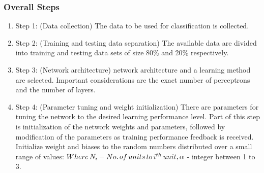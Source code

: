 \documentclass[a4paper,14pt,onecolumn]{article}
\begin{document}
\subsubsection{Overall Steps}
\begin{enumerate}

\item Step 1: (Data collection) The data to be used for classification is collected. 

\item Step 2: (Training and testing data separation) The available data are divided into training and testing data sets of size 80\% and 20\% respectively.

\item Step 3: (Network architecture) network architecture and a learning method are selected. Important considerations are the exact number of perceptrons and the number of layers. 
 
\item Step 4: (Parameter tuning and weight initialization) There are parameters for tuning the network to the desired learning performance level. Part of this step is initialization of the network weights and parameters, followed by modification of the parameters as training performance feedback is received. \\ 
Initialize weight and biases to the random numbers distributed over a small range of values:
 \begin{math}      [{-\alpha \over \sqrt{Ni}} ,{ -\alpha \over \sqrt{Ni}}]\\
                           Where\,N_{i}  -No. \,of \,units\, to \, i^{th}\, unit,\\
				   \alpha  \end{math}   - integer between 1 to 3.       



\end{enumerate}
\end{document}

